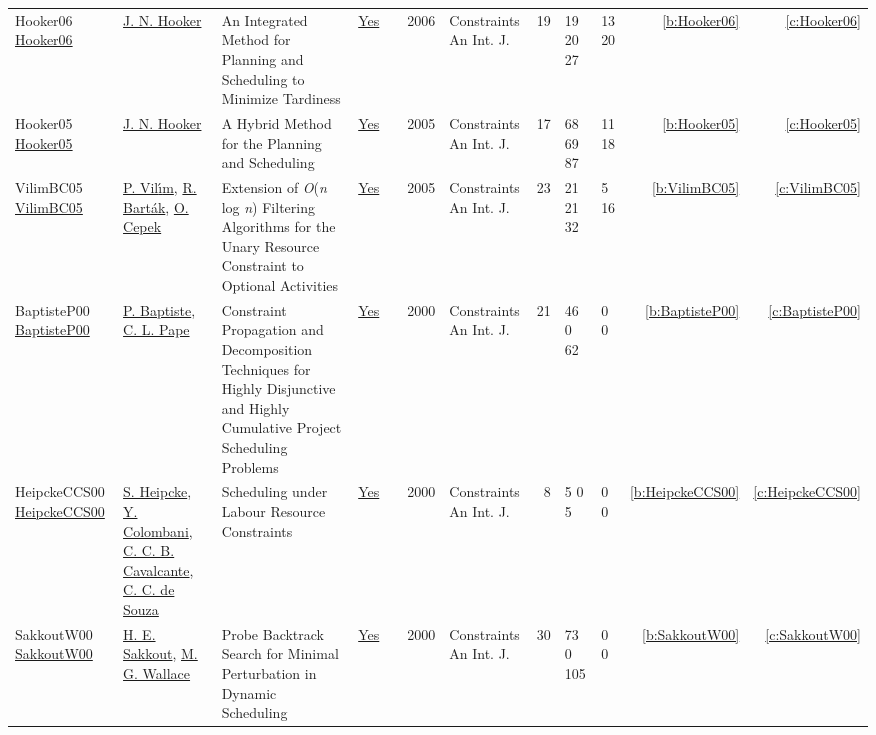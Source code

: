 {\begin{longtable}{>{\raggedright\arraybackslash}p{3cm}>{\raggedright\arraybackslash}p{4.5cm}>{\raggedright\arraybackslash}p{6.0cm}rrrp{2.5cm}rp{1cm}p{1cm}rr}
Hooker06 \href{https://doi.org/10.1007/s10601-006-8060-2}{Hooker06} & \hyperref[auth:a160]{J. N. Hooker} & \cellcolor{green!10}An Integrated Method for Planning and Scheduling to Minimize Tardiness & \href{../works/Hooker06.pdf}{Yes} & \cite{Hooker06} & 2006 & Constraints An Int. J. & 19 & 19 20 27 & 13 20 & \ref{b:Hooker06} & \ref{c:Hooker06}\\
Hooker05 \href{https://doi.org/10.1007/s10601-005-2812-2}{Hooker05} & \hyperref[auth:a160]{J. N. Hooker} & \cellcolor{green!10}A Hybrid Method for the Planning and Scheduling & \href{../works/Hooker05.pdf}{Yes} & \cite{Hooker05} & 2005 & Constraints An Int. J. & 17 & 68 69 87 & 11 18 & \ref{b:Hooker05} & \ref{c:Hooker05}\\
VilimBC05 \href{https://doi.org/10.1007/s10601-005-2814-0}{VilimBC05} & \hyperref[auth:a121]{P. Vil{\'{\i}}m}, \hyperref[auth:a152]{R. Bart{\'{a}}k}, \hyperref[auth:a161]{O. Cepek} & Extension of \emph{O}(\emph{n} log \emph{n}) Filtering Algorithms for the Unary Resource Constraint to Optional Activities & \href{../works/VilimBC05.pdf}{Yes} & \cite{VilimBC05} & 2005 & Constraints An Int. J. & 23 & 21 21 32 & 5 16 & \ref{b:VilimBC05} & \ref{c:VilimBC05}\\
BaptisteP00 \href{https://doi.org/10.1023/A:1009822502231}{BaptisteP00} & \hyperref[auth:a162]{P. Baptiste}, \hyperref[auth:a163]{C. L. Pape} & Constraint Propagation and Decomposition Techniques for Highly Disjunctive and Highly Cumulative Project Scheduling Problems & \href{../works/BaptisteP00.pdf}{Yes} & \cite{BaptisteP00} & 2000 & Constraints An Int. J. & 21 & 46 0 62 & 0 0 & \ref{b:BaptisteP00} & \ref{c:BaptisteP00}\\
HeipckeCCS00 \href{https://doi.org/10.1023/A:1009860311452}{HeipckeCCS00} & \hyperref[auth:a167]{S. Heipcke}, \hyperref[auth:a168]{Y. Colombani}, \hyperref[auth:a169]{C. C. B. Cavalcante}, \hyperref[auth:a170]{C. C. de Souza} & Scheduling under Labour Resource Constraints & \href{../works/HeipckeCCS00.pdf}{Yes} & \cite{HeipckeCCS00} & 2000 & Constraints An Int. J. & 8 & 5 0 5 & 0 0 & \ref{b:HeipckeCCS00} & \ref{c:HeipckeCCS00}\\
SakkoutW00 \href{https://doi.org/10.1023/A:1009856210543}{SakkoutW00} & \hyperref[auth:a166]{H. E. Sakkout}, \hyperref[auth:a117]{M. G. Wallace} & Probe Backtrack Search for Minimal Perturbation in Dynamic Scheduling & \href{../works/SakkoutW00.pdf}{Yes} & \cite{SakkoutW00} & 2000 & Constraints An Int. J. & 30 & 73 0 105 & 0 0 & \ref{b:SakkoutW00} & \ref{c:SakkoutW00}\\

\end{longtable}}
